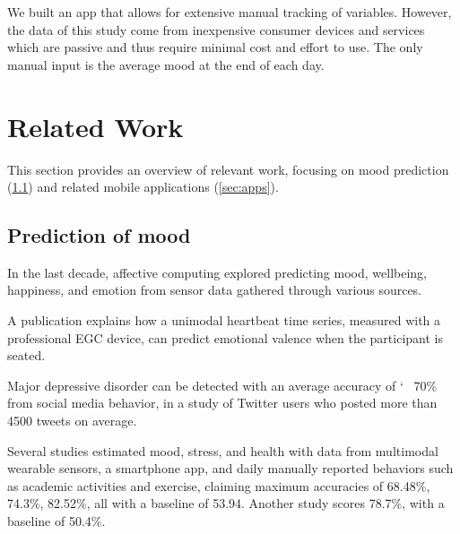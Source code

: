 \documentclass[conference]{IEEEtran}
\begin{document}



We built an app that allows for extensive manual tracking of variables.
However, the data of this study come from inexpensive consumer devices and services which are passive and thus require minimal cost and effort to use.
The only manual input is the average mood at the end of each day. 







\section{Related Work}
This section provides an overview of relevant work, focusing on mood prediction (\ref{sec:wellbeing}) and related mobile applications (\ref{sec:apps}).

\subsection{Prediction of mood}
\label{sec:wellbeing}

In the last decade, affective computing explored predicting mood, wellbeing, happiness, and emotion from sensor data gathered through various sources.

A publication explains how a unimodal heartbeat time series, measured with a professional EGC device, can predict emotional valence when the participant is seated\cite{harper_bayesian_2020}. 

Major depressive disorder can be detected with an average accuracy of \char`~ 70\% from social media behavior, in a study of Twitter users who posted more than 4500 tweets on average\cite{choudhury_predicting_2013}.

Several studies estimated mood, stress, and health with data from multimodal wearable sensors, a smartphone app, and daily manually reported behaviors such as academic activities and exercise, claiming maximum accuracies of
 68.48\%\cite{jaques_predicting_2015},
 74.3\%\cite{jaques_multi-task_2015},
 82.52\%\cite{jaques_multi-task_2016}, all with a baseline of 53.94. Another study scores 78.7\%, with a baseline of 50.4\%\cite{taylor_personalized_2020}. 
 
\end{document}
